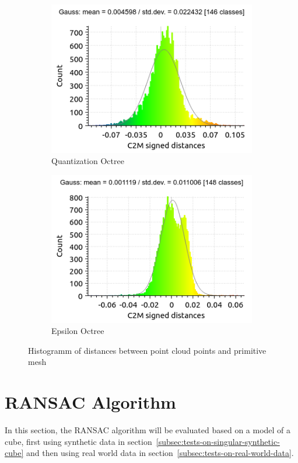 \begin{figure}[h!tp]
    \centering
    \begin{subfigure}[b]{0.5\textwidth}
        \centering
        \includegraphics[width=0.9\linewidth]{images/eval-quant-hist}
        \caption{Quantization Octree}
    \end{subfigure}%
    \begin{subfigure}[b]{0.5\textwidth}
        \centering
        \includegraphics[width=0.9\linewidth]{images/eval-epsilon-hist}
        \caption{Epsilon Octree}
    \end{subfigure}%
    \caption{Histogramm of distances between point cloud points and primitive mesh}
    \label{fig:octrees-compairison-stats}
\end{figure}

\section{RANSAC Algorithm}\label{sec:eval-ransac-algorithm}
In this section, the RANSAC algorithm will be evaluated based on a model of a cube,
first using synthetic data in section~\ref{subsec:tests-on-singular-synthetic-cube} and then using real world data
in section~\ref{subsec:tests-on-real-world-data}.

